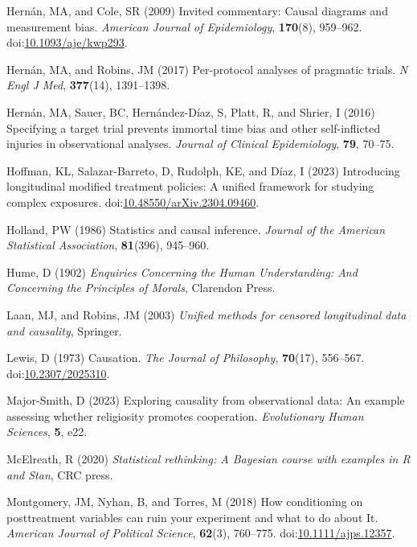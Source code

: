 \documentclass[
  singlecolumn]{article}
\newlength{\cslhangindent}
\newenvironment{CSLReferences}[2] %
 {\begin{list}{}{%
  \setlength{\itemindent}{0pt}
  \setlength{\leftmargin}{0pt}
  \setlength{\parsep}{0pt}
  \ifodd #1
   \setlength{\leftmargin}{\cslhangindent}
   \setlength{\itemindent}{-1\cslhangindent}
  \fi
  \setlength{\itemsep}{#2\baselineskip}}}
 {\end{list}}
\begin{document}
\begin{CSLReferences}{1}{0}
Hernán, MA, and Cole, SR (2009) Invited commentary: Causal diagrams and
measurement bias. \emph{American Journal of Epidemiology},
\textbf{170}(8), 959--962.
doi:\href{https://doi.org/10.1093/aje/kwp293}{10.1093/aje/kwp293}.

Hernán, MA, and Robins, JM (2017) Per-protocol analyses of pragmatic
trials. \emph{N Engl J Med}, \textbf{377}(14), 1391--1398.

Hernán, MA, Sauer, BC, Hernández-Díaz, S, Platt, R, and Shrier, I (2016)
Specifying a target trial prevents immortal time bias and other
self-inflicted injuries in observational analyses. \emph{Journal of
Clinical Epidemiology}, \textbf{79}, 70--75.

Hoffman, KL, Salazar-Barreto, D, Rudolph, KE, and Díaz, I (2023)
Introducing longitudinal modified treatment policies: A unified
framework for studying complex exposures.
doi:\href{https://doi.org/10.48550/arXiv.2304.09460}{10.48550/arXiv.2304.09460}.

Holland, PW (1986) Statistics and causal inference. \emph{Journal of the
American Statistical Association}, \textbf{81}(396), 945--960.

Hume, D (1902) \emph{Enquiries Concerning the Human Understanding: And
Concerning the Principles of Morals}, Clarendon Press.

Laan, MJ, and Robins, JM (2003) \emph{Unified methods for censored
longitudinal data and causality}, Springer.

Lewis, D (1973) Causation. \emph{The Journal of Philosophy},
\textbf{70}(17), 556--567.
doi:\href{https://doi.org/10.2307/2025310}{10.2307/2025310}.

Major-Smith, D (2023) Exploring causality from observational data: An
example assessing whether religiosity promotes cooperation.
\emph{Evolutionary Human Sciences}, \textbf{5}, e22.

McElreath, R (2020) \emph{Statistical rethinking: A {B}ayesian course
with examples in {R} and {S}tan}, CRC press.

Montgomery, JM, Nyhan, B, and Torres, M (2018) How conditioning on
posttreatment variables can ruin your experiment and what to do about
It. \emph{American Journal of Political Science}, \textbf{62}(3),
760--775.
doi:\href{https://doi.org/10.1111/ajps.12357}{10.1111/ajps.12357}.


\end{CSLReferences}
\end{document}
